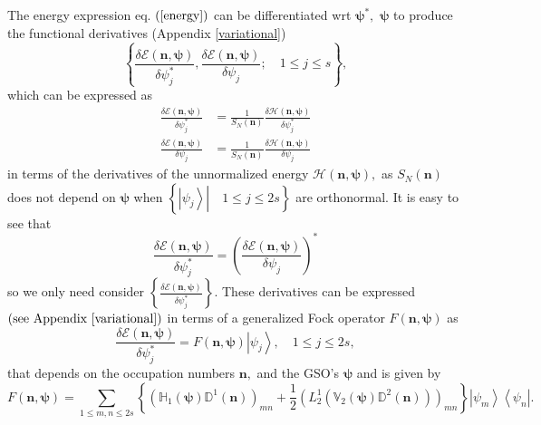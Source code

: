 \documentclass[aps,preprint]{revtex4}%
\begin{document}
The energy expression eq. $\left(  \ref{energy}\right)  $ can be
differentiated wrt $\bm{\psi}^{\ast},$ $\bm{\psi}$ to produce the functional
derivatives (Appendix \ref{variational})
\begin{equation}
\left\{  \frac{\delta\mathcal{E}\left(  \bm{n,\psi}\right)  }{\delta\psi
_{j}^{\ast}},\frac{\delta\mathcal{E}\left(  \bm{n,\psi}\right)  }{\delta
\psi_{j}};\quad1\leq j\leq s\right\}  ,
\end{equation}
which can be expressed as%
\begin{align}
\frac{\delta\mathcal{E}\left(  \bm{n,\psi}\right)  }{\delta\psi_{j}^{\ast}}
&  =\frac{1}{S_{N}\left(  \bm{n}\right)  }\frac{\delta\mathcal{H}\left(
\bm{n,\psi}\right)  }{\delta\psi_{j}^{\ast}}\\
\frac{\delta\mathcal{E}\left(  \bm{n,\psi}\right)  }{\delta\psi_{j}}  &
=\frac{1}{S_{N}\left(  \bm{n}\right)  }\frac{\delta\mathcal{H}\left(
\bm{n,\psi}\right)  }{\delta\psi_{j}}%
\end{align}
in terms of the derivatives of the unnormalized energy $\mathcal{H}\left(
\bm{n,\psi}\right)  ,$ as $S_{N}\left(  \bm{n}\right)  $ does not depend on
$\bm{\psi}$ when $\left\{  \left.  \left\vert \psi_{j}\right\rangle
\right\vert \quad1\leq j\leq2s\right\}  $ are orthonormal. It is easy to see
that
\begin{equation}
\frac{\delta\mathcal{E}\left(  \bm{n,\psi}\right)  }{\delta\psi_{j}^{\ast}%
}=\left(  \frac{\delta\mathcal{E}\left(  \bm{n,\psi}\right)  }{\delta\psi_{j}%
}\right)  ^{\ast}%
\end{equation}
so we only need consider $\left\{  \frac{\delta\mathcal{E}\left(
\bm{n,\psi}\right)  }{\delta\psi_{j}^{\ast}}\right\}  .$ These derivatives can
be expressed $\left(  \text{see Appendix \ref{variational}}\right)  $ in terms
of a generalized Fock operator $F\left(  \bm{n,\psi}\right)  $ as
\begin{equation}
\frac{\delta\mathcal{E}\left(  \bm{n,\psi}\right)  }{\delta\psi_{j}^{\ast}%
}=F\left(  \bm{n,\psi}\right)  \left\vert \psi_{j}\right\rangle ,\quad1\leq
j\leq2s, \label{H_deriv}%
\end{equation}
that depends on the occupation numbers $\bm{n,}$ and the GSO's $\bm{\psi}$ and
is given by
\begin{equation}
F\left(  \bm{n,\psi}\right)  =\sum_{1\leq m,n\leq2s}\left\{  \left(
\mathbb{H}_{1}\left(  \bm{\psi}\right)  \mathbb{D}^{1}\left(  \bm{n}\right)
\right)  _{mn}+\frac{1}{2}\left(  L_{2}^{1}\left(  \mathbb{V}_{2}\left(
\bm{\psi}\right)  \mathbb{D}^{2}\left(  \bm{n}\right)  \right)  \right)
_{mn}\right\}  \left\vert \psi_{m}\right\rangle \left\langle \psi
_{n}\right\vert . \label{genfock}%
\end{equation}
\end{document}
